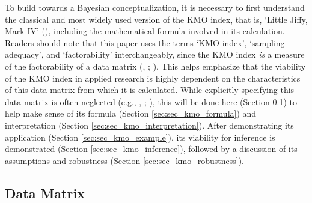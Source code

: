 \documentclass[
  10pt,
  a4paper,
  twoside]{article}
\begin{document}
To build towards a Bayesian conceptualization, it is necessary to first understand the classical and most widely used version of the KMO index, that is, `Little Jiffy, Mark IV' (), including the mathematical formula involved in its calculation. Readers should note that this paper uses the terms `KMO index', `sampling adequacy', and `factorability' interchangeably, since the KMO index \emph{is} a measure of the factorability of a data matrix (, ; ). This helps emphasize that the viability of the KMO index in applied research is highly dependent on the characteristics of this data matrix from which it is calculated. While explicitly specifying this data matrix is often neglected (e.g., , ; ), this will be done here (Section \ref{sec:sec_kmo_data}) to help make sense of its formula (Section \ref{sec:sec_kmo_formula}) and interpretation (Section \ref{sec:sec_kmo_interpretation}). After demonstrating its application (Section \ref{sec:sec_kmo_example}), its viability for inference is demonstrated (Section \ref{sec:sec_kmo_inference}), followed by a discussion of its assumptions and robustness (Section \ref{sec:sec_kmo_robustness}).

\subsection{Data Matrix}\label{sec:sec_kmo_data}
\end{document}
